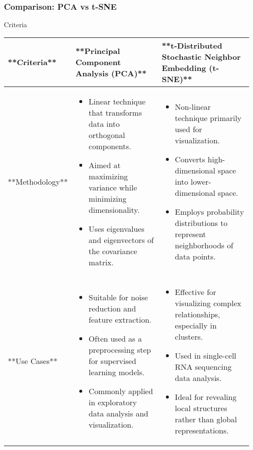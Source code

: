 \documentclass[aspectratio=169]{beamer}
\begin{document}
\begin{frame}[fragile]
    \frametitle{Comparison: PCA vs t-SNE}
    \begin{block}{Criteria}
        \begin{tabular}{|l|l|l|}
            \hline
            **Criteria** & **Principal Component Analysis (PCA)** & **t-Distributed Stochastic Neighbor Embedding (t-SNE)** \\
            \hline
            **Methodology** & 
            \begin{itemize}
                \item Linear technique that transforms data into orthogonal components.
                \item Aimed at maximizing variance while minimizing dimensionality.
                \item Uses eigenvalues and eigenvectors of the covariance matrix.
            \end{itemize} 
            & 
            \begin{itemize}
                \item Non-linear technique primarily used for visualization.
                \item Converts high-dimensional space into lower-dimensional space.
                \item Employs probability distributions to represent neighborhoods of data points.
            \end{itemize} \\
            \hline
            **Use Cases** & 
            \begin{itemize}
                \item Suitable for noise reduction and feature extraction.
                \item Often used as a preprocessing step for supervised learning models.
                \item Commonly applied in exploratory data analysis and visualization.
            \end{itemize} 
            & 
            \begin{itemize}
                \item Effective for visualizing complex relationships, especially in clusters.
                \item Used in single-cell RNA sequencing data analysis.
                \item Ideal for revealing local structures rather than global representations.
            \end{itemize} \\

\end{tabular}
\end{block}
\end{frame}
\end{document}
